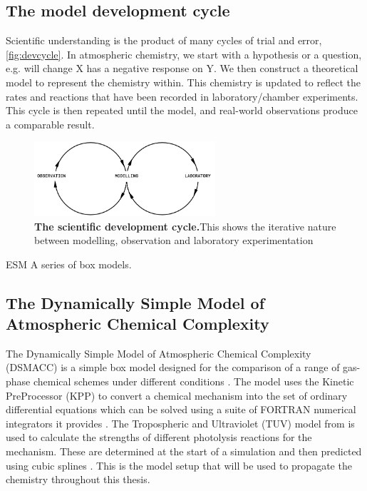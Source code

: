 \subsection{The model development cycle}
Scientific understanding is the product of many cycles of trial and error, \autoref{fig:devcycle}. In atmospheric chemistry, we start with a hypothesis or a question, e.g. will change X has a negative response on Y. We then construct a theoretical model to represent the chemistry within. This chemistry is updated to reflect the rates and reactions that have been recorded in laboratory/chamber experiments. This cycle is then repeated until the model, and real-world observations produce a comparable result.
\begin{figure}[H]
    \centering
    \includegraphics[width=0.6\textwidth]{devcycle.png}
    \caption{\textbf{The scientific development cycle.}This shows the iterative nature between modelling, observation and laboratory experimentation}
    \label{fig:devcycle}
\end{figure}

ESM
 A series of box models.
 \subsection{The Dynamically Simple Model of Atmospheric Chemical Complexity}

 
 The Dynamically Simple Model of Atmospheric Chemical Complexity (DSMACC) is a simple box model designed for the comparison of a range of gas-phase chemical schemes under different conditions \citep{dsmacc}.
 The model uses the  Kinetic PreProcessor (KPP) to convert a chemical mechanism into the set of ordinary differential equations which can be solved using a suite of FORTRAN numerical integrators it provides \citep{kpp}. The Tropospheric and Ultraviolet (TUV) model from \cite{tuv} is used to calculate the strengths of different photolysis reactions for the mechanism. These are determined at the start of a simulation and then predicted using cubic splines \citep{dsmaccgit}. This is the model setup that will be used to propagate the chemistry throughout this thesis. 






